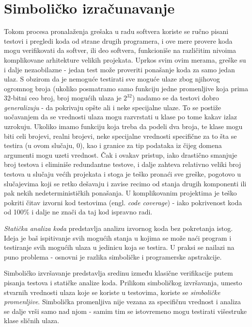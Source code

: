 \section{Simboličko izračunavanje}
\label{sec:Symbolics}

Tokom procesa pronalaženja grešaka u radu softvera koriste se ručno pisani testovi i pregledi koda od strane drugih programera, i ove mere provere koda mogu verifikovati da softver, ili deo softvera, funkcioniše na različitim nivoima komplikovane arhitekture velikih projekata. Uprkos svim ovim merama, greške su i dalje nezaobilazne - jedan test može proveriti ponašanje koda za samo jedan ulaz. S obzirom da je nemoguće testirati sve moguće ulaze zbog njihovog ogromnog broja (ukoliko posmatramo samo funkciju jedne promenljive koja prima 32-bitni ceo broj, broj mogućih ulaza je $2^{32}$) nadamo se da testovi dobro \emph{generalizuju} - da pokrivaju opšte ali i neke specijalne ulaze. To se postiže uočavanjem da se vrednosti ulaza mogu razvrstati u klase po tome kakav izlaz uzrokuju. Ukoliko imamo funkciju koja treba da podeli dva broja, te klase mogu biti celi brojevi, realni brojevi, neke specijalne vrednosti specifične za to šta se testira (u ovom slučaju, $0$), kao i granice za tip podataka iz čijeg domena argumenti mogu uzeti vrednost. Čak i ovakav pristup, iako drastično smanjuje broj testova i eliminiše redundantne testove, i dalje zahteva relativno veliki broj testova u slučaju većih projekata i stoga je teško pronaći sve greške, pogotovo u slučajevima koji se retko dešavaju i zavise recimo od stanja drugih komponenti ili pak nekih nedeterminističkih ponašanja. U komplikovanim projektima je teško pokriti čitav izvorni kod testovima (engl. \emph{code coverage}) - iako pokrivenost koda od 100\% i dalje ne znači da taj kod ispravno radi.

\emph{Statička analiza koda} predstavlja analizu izvornog koda bez pokretanja istog. Ideja je baš ispitivanje svih mogućih stanja u kojima se može naći program i testiranje svih mogućih ulaza u jedinicu koja se testira. U praksi se nailazi na puno problema - osnovni je razlika simboličke i programerske apstrakcije. 

Simboličko izvršavanje \cite{SymbolicExecution} predstavlja sredinu između klasične verifikacije putem pisanja testova i statičke analize koda. Prilikom simboličkog izvršavanja, umesto stvarnih vrednosti ulaza koje se koriste u testovima, koriste se \emph{simboličke promenljive}. Simbolička promenljiva nije vezana za specifičnu vrednost i analiza se dalje vrši samo nad njom - samim tim se istovremeno mogu testirati višestruke klase sličnih ulaza. 

